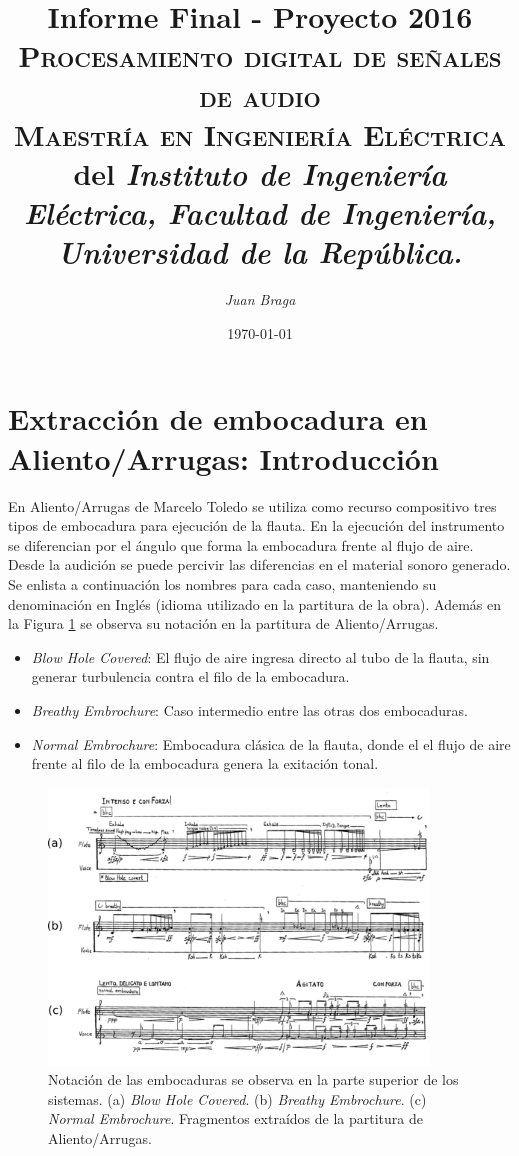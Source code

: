 \documentclass{article}
\title{\textbf{Informe Final - Proyecto 2016}\\\large \textsc{Procesamiento digital de señales de audio}\\
 \textsc{Maestría en Ingeniería Eléctrica} del \textit{Instituto de Ingeniería Eléctrica, Facultad de Ingeniería, Universidad de la República.}}
\author{\textit{Juan Braga}}
\date{\today}
\begin{document}
\maketitle 


\section*{Extracción de embocadura en Aliento/Arrugas: Introducción}
En Aliento/Arrugas de Marcelo Toledo se utiliza como recurso compositivo tres tipos de embocadura para ejecución de la flauta. En la ejecución del instrumento se diferencian por el ángulo que forma la embocadura frente al flujo de aire. Desde la audición se puede percivir las diferencias en el material sonoro generado. Se enlista a continuación los nombres para cada caso, manteniendo su denominación en Inglés (idioma utilizado en la partitura de la obra). Además en la Figura \ref{fig:embocaduras} se observa su notación en la partitura de Aliento/Arrugas.

\begin{itemize} 
  \item \textit{Blow Hole Covered}: El flujo de aire ingresa directo al tubo de la flauta, sin generar turbulencia contra el filo de la embocadura. 
  \item \textit{Breathy Embrochure}: Caso intermedio entre las otras dos embocaduras. 
  \item \textit{Normal Embrochure}: Embocadura clásica de la flauta, donde el el flujo de aire frente al filo de la embocadura genera la exitación tonal.
\end{itemize}
\medskip

\begin{figure}[H]
\begin{center}
\includegraphics[width=0.9\textwidth]{embocaduras} 
\caption{Notación de las embocaduras se observa en la parte superior de los sistemas. (a) \textit{Blow Hole Covered}. (b) \textit{Breathy Embrochure}. (c) \textit{Normal Embrochure}. Fragmentos extraídos de la partitura de Aliento/Arrugas.}
\label{fig:embocaduras}
\end{center}
\end{figure}
\end{document}
